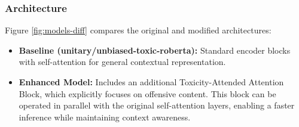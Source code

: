 \subsubsection{Architecture}
Figure \ref{fig:models-diff} compares the original and modified architectures:

\begin{itemize}
    \item \textbf{Baseline (unitary/unbiased-toxic-roberta):} Standard encoder blocks with self-attention for general contextual representation.
    \item \textbf{Enhanced Model:} Includes an additional Toxicity-Attended Attention Block, which explicitly focuses on offensive content. This block can be operated in parallel with the original self-attention layers, enabling a faster inference while maintaining context awareness.
\end{itemize}

